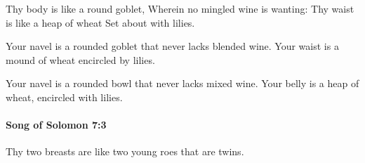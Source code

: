 			\begin{versebox}
					\item[BHS] 
					\item[LXX] 
					\item[ASV] Thy body is like a round goblet, Wherein no mingled wine is wanting: Thy waist is like a heap of wheat Set about with lilies.
					\item[NIV] Your navel is a rounded goblet that never lacks blended wine. Your waist is a mound of wheat encircled by lilies.
					\item[NRSV] Your navel is a rounded bowl that never lacks mixed wine. Your belly is a heap of wheat, encircled with lilies.
			\end{versebox}

		\paragraph{Song of Solomon 7:3} %
			\label{SONGOFSOLOMON-7-3}

			Thy two breasts are like two young roes that are twins.

